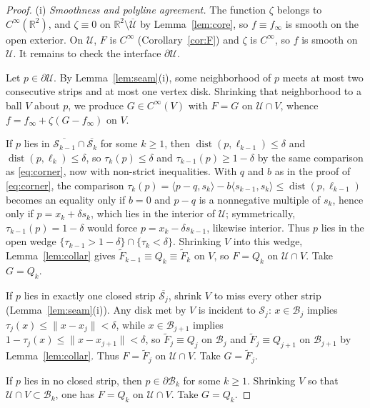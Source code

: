 \documentclass[11pt]{article}
\newcommand{\R}{\mathbb{R}}
\newcommand{\ip}[2]{\langle #1,#2\rangle}
\begin{document}
\begin{proof}
(i) \emph{Smoothness and polyline agreement.}
The function $\zeta$ belongs to $C^\infty(\R^2)$, and $\zeta\equiv 0$ on $\R^2\setminus\overline{\mathcal U}$ by Lemma~\ref{lem:core}, so $f\equiv f_\infty$ is smooth on the open exterior.
On $\mathcal U$, $F$ is $C^\infty$ (Corollary~\ref{cor:F}) and $\zeta$ is $C^\infty$, so $f$ is smooth on $\mathcal U$.
It remains to check the interface $\partial\mathcal U$.

Let $p\in\partial\mathcal U$. By Lemma~\ref{lem:seam}(i), some neighborhood of $p$ meets at most two consecutive strips and at most one vertex disk. Shrinking that neighborhood to a ball $V$ about $p$, we produce $G\in C^\infty(V)$ with $F=G$ on $\mathcal U\cap V$, whence $f=f_\infty+\zeta(G-f_\infty)$ on $V$.

If $p$ lies in $\overline{\mathcal S_{k-1}}\cap\overline{\mathcal S_k}$ for some $k\ge 1$, then $\operatorname{dist}(p,\ell_{k-1})\le\delta$ and $\operatorname{dist}(p,\ell_k)\le\delta$, so $\tau_k(p)\le\delta$ and $\tau_{k-1}(p)\ge 1-\delta$ by the same comparison as \eqref{eq:corner}, now with non-strict inequalities.
With $q$ and $b$ as in the proof of \eqref{eq:corner}, the comparison $\tau_k(p)=\ip{p-q}{s_k}-b\ip{s_{k-1}}{s_k}\le\operatorname{dist}(p,\ell_{k-1})$ becomes an equality only if $b=0$ and $p-q$ is a nonnegative multiple of $s_k$, hence only if $p=x_k+\delta s_k$, which lies in the interior of $\mathcal U$; symmetrically, $\tau_{k-1}(p)=1-\delta$ would force $p=x_k-\delta s_{k-1}$, likewise interior.
Thus $p$ lies in the open wedge $\{\tau_{k-1}>1-\delta\}\cap\{\tau_k<\delta\}$. Shrinking $V$ into this wedge, Lemma~\ref{lem:collar} gives $\widetilde F_{k-1}\equiv Q_k\equiv\widetilde F_k$ on $V$, so $F=Q_k$ on $\mathcal U\cap V$. Take $G=Q_k$.

If $p$ lies in exactly one closed strip $\overline{\mathcal S_j}$, shrink $V$ to miss every other strip (Lemma~\ref{lem:seam}(i)). Any disk met by $V$ is incident to $\mathcal S_j$: $x\in\mathcal B_j$ implies $\tau_j(x)\le\|x-x_j\|<\delta$, while $x\in\mathcal B_{j+1}$ implies $1-\tau_j(x)\le\|x-x_{j+1}\|<\delta$, so $\widetilde F_j\equiv Q_j$ on $\mathcal B_j$ and $\widetilde F_j\equiv Q_{j+1}$ on $\mathcal B_{j+1}$ by Lemma~\ref{lem:collar}. Thus $F=\widetilde F_j$ on $\mathcal U\cap V$. Take $G=\widetilde F_j$.

If $p$ lies in no closed strip, then $p\in\partial\mathcal B_k$ for some $k\ge 1$. Shrinking $V$ so that $\mathcal U\cap V\subset\mathcal B_k$, one has $F=Q_k$ on $\mathcal U\cap V$. Take $G=Q_k$.


\end{proof}
\end{document}
